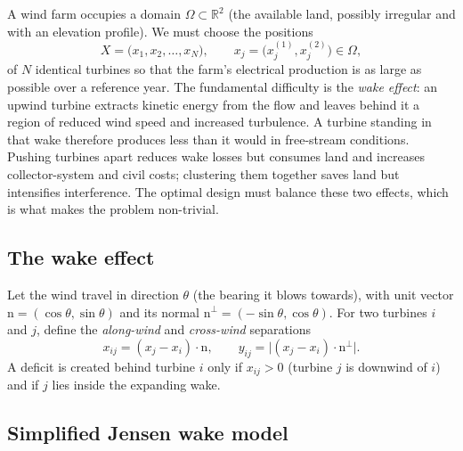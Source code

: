 \documentclass[11pt,a4paper]{article}
\newcommand{\R}{\mathbb{R}}
\begin{document}
A wind farm occupies a domain $\Omega \subset \R^{2}$ (the available land,
possibly irregular and with an elevation profile). We must choose the positions
\[
  X = \bigl(x_{1}, x_{2}, \dots, x_{N}\bigr), \qquad
  x_{j} = \bigl(x_{j}^{(1)}, x_{j}^{(2)}\bigr) \in \Omega,
\]
of $N$ identical turbines so that the farm's electrical production is as large
as possible over a reference year. The fundamental difficulty is the
\emph{wake effect}: an upwind turbine extracts kinetic energy from the flow and
leaves behind it a region of reduced wind speed and increased turbulence. A
turbine standing in that wake therefore produces less than it would in
free-stream conditions. Pushing turbines apart reduces wake losses but consumes
land and increases collector-system and civil costs; clustering them together
saves land but intensifies interference. The optimal design must balance these
two effects, which is what makes the problem non-trivial.

\subsection{The wake effect}

Let the wind travel in direction $\theta$ (the bearing it blows towards), with
unit vector $\mathrm{n}=(\cos\theta,\sin\theta)$ and its normal
$\mathrm{n}^{\perp}=(-\sin\theta,\cos\theta)$. For two turbines $i$ and $j$,
define the \emph{along-wind} and \emph{cross-wind} separations
\begin{equation}
  x_{ij} = (x_{j}-x_{i})\cdot\mathrm{n},
  \qquad
  y_{ij} = \bigl\lvert (x_{j}-x_{i})\cdot\mathrm{n}^{\perp} \bigr\rvert .
  \label{eq:separations}
\end{equation}
A deficit is created behind turbine $i$ only if $x_{ij}>0$ (turbine $j$ is
downwind of $i$) and if $j$ lies inside the expanding wake.

\subsection{Simplified Jensen wake model}
\end{document}
